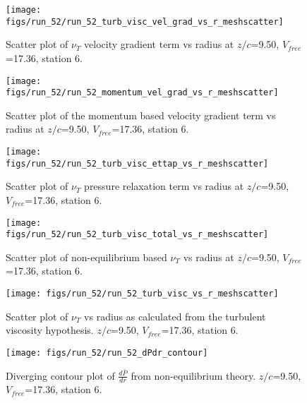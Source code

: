 \begin{figure}[H]
\centering
\texttt{[image: figs/run\_52/run\_52\_turb\_visc\_vel\_grad\_vs\_r\_meshscatter]}
\caption{Scatter plot of $\nu_T$ velocity gradient term vs radius at $z/c$=9.50, $V_{free}$=17.36, station 6.}
\end{figure}


\begin{figure}[H]
\centering
\texttt{[image: figs/run\_52/run\_52\_momentum\_vel\_grad\_vs\_r\_meshscatter]}
\caption{Scatter plot of the momentum based velocity gradient term vs radius at $z/c$=9.50, $V_{free}$=17.36, station 6.}
\end{figure}


\begin{figure}[H]
\centering
\texttt{[image: figs/run\_52/run\_52\_turb\_visc\_ettap\_vs\_r\_meshscatter]}
\caption{Scatter plot of $\nu_T$ pressure relaxation term vs radius at $z/c$=9.50, $V_{free}$=17.36, station 6.}
\end{figure}


\begin{figure}[H]
\centering
\texttt{[image: figs/run\_52/run\_52\_turb\_visc\_total\_vs\_r\_meshscatter]}
\caption{Scatter plot of non-equilibrium based $\nu_T$ vs radius at $z/c$=9.50, $V_{free}$=17.36, station 6.}
\end{figure}


\begin{figure}[H]
\centering
\texttt{[image: figs/run\_52/run\_52\_turb\_visc\_vs\_r\_meshscatter]}
\caption{Scatter plot of $\nu_T$ vs radius as calculated from the turbulent viscosity hypothesis. $z/c$=9.50, $V_{free}$=17.36, station 6.}
\end{figure}


\begin{figure}[H]
\centering
\texttt{[image: figs/run\_52/run\_52\_dPdr\_contour]}
\caption{Diverging contour plot of $\frac{d\bar{P}}{dr}$ from non-equilibrium theory. $z/c$=9.50, $V_{free}$=17.36, station 6.}
\end{figure}


